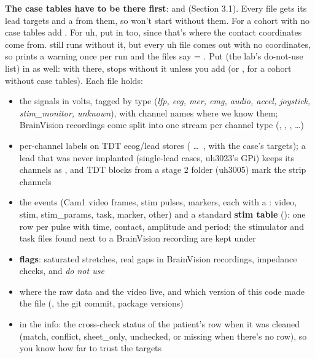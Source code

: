 \textbf{The case tables have to be there first}:  and  (Section 3.1). Every file gets its lead targets and a  from them, so  won't start without them. For a cohort with no case tables add . For uh, put  in too, since that's where the contact coordinates come from.  still runs without it, but every uh file comes out with no coordinates, so  prints a warning once per run and the files say  = . Put  (the lab's do-not-use list) in as well: with  there,  stops without it unless you add  (or , for a cohort without case tables). Each file holds:
\begin{itemize}
  \item the signals in volts, tagged by type (\textit{lfp, eeg, mer, emg, audio, accel, joystick, stim\_monitor, unknown}), with channel names where we know them; BrainVision recordings come split into one stream per channel type (, , , \ldots)
  \item per-channel labels on TDT ecog/lead stores ( \ldots\ , with the case's targets); a lead that was never implanted (single-lead cases, uh3023's GPi) keeps its channels as , and TDT blocks from a stage 2 folder (uh3005) mark the strip channels 
  \item the events (Cam1 video frames, stim pulses, markers, each with a : video, stim, stim\_params, task, marker, other) and a standard \textbf{stim table} (): one row per pulse with time, contact, amplitude and period; the stimulator and task files found next to a BrainVision recording are kept under 
  \item \textbf{flags}: saturated stretches, real gaps in BrainVision recordings, impedance checks, and \textit{do not use}
  \item where the raw data and the video live, and which version of this code made the file (, the git commit, package versions)
  \item {} in the info: the cross-check status of the patient's  row when it was cleaned (match, conflict, sheet\_only, unchecked, or missing when there's no row), so you know how far to trust the targets
\end{itemize}

